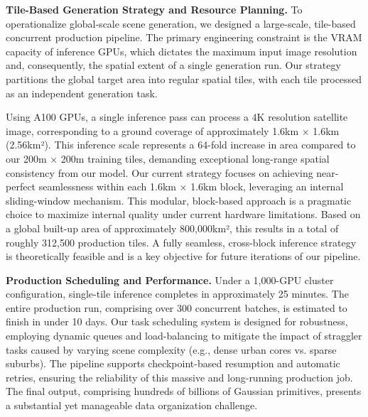\documentclass{llmxive}
\providecommand{\paragraph}[1]{\noindent\textbf{#1.}\hspace*{1em}}
\begin{document}
\paragraph{Tile-Based Generation Strategy and Resource Planning}
To operationalize global-scale scene generation, we designed a large-scale, tile-based concurrent production pipeline. The primary engineering constraint is the VRAM capacity of inference GPUs, which dictates the maximum input image resolution and, consequently, the spatial extent of a single generation run. Our strategy partitions the global target area into regular spatial tiles, with each tile processed as an independent generation task.

Using A100 GPUs, a single inference pass can process a 4K resolution satellite image, corresponding to a ground coverage of approximately 1.6km × 1.6km (2.56km²). This inference scale represents a {64-fold increase in area} compared to our 200m × 200m training tiles, demanding exceptional long-range spatial consistency from our model. Our current strategy focuses on achieving near-perfect seamlessness within each 1.6km × 1.6km block, leveraging an internal sliding-window mechanism. This modular, block-based approach is a pragmatic choice to maximize internal quality under current hardware limitations. Based on a global built-up area of approximately 800,000km², this results in a total of roughly 312,500 production tiles. A fully seamless, cross-block inference strategy is theoretically feasible and is a key objective for future iterations of our pipeline.

\paragraph{Production Scheduling and Performance}
Under a 1,000-GPU cluster configuration, single-tile inference completes in approximately 25 minutes. The entire production run, comprising over 300 concurrent batches, is estimated to finish in under 10 days. Our task scheduling system is designed for robustness, employing dynamic queues and load-balancing to mitigate the impact of straggler tasks caused by varying scene complexity (e.g., dense urban cores vs. sparse suburbs). The pipeline supports checkpoint-based resumption and automatic retries, ensuring the reliability of this massive and long-running production job. The final output, comprising hundreds of billions of Gaussian primitives, presents a substantial yet manageable data organization challenge.
\end{document}
